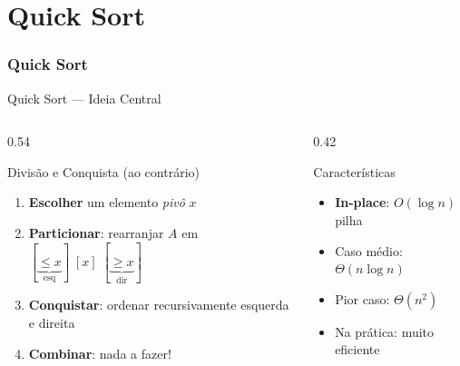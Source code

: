 \documentclass[aspectratio=169]{beamer}
\begin{document}
\part{Quick Sort}
\section{Quick Sort}

\begin{frame}{Quick Sort — Ideia Central}
  \begin{columns}[T]
    \begin{column}{0.54\textwidth}
      \begin{block}{Divisão e Conquista (ao contrário)}
        \begin{enumerate}
          \item \textbf{Escolher} um elemento \emph{pivô} $x$
          \item \textbf{Particionar}: rearranjar $A$ em\\
                $[\underbrace{\leq x}_{\text{esq}}]\;[x]\;[\underbrace{\geq x}_{\text{dir}}]$
          \item \textbf{Conquistar}: ordenar recursivamente esquerda e direita
          \item \textbf{Combinar}: nada a fazer!
        \end{enumerate}
      \end{block}
    \end{column}
    \begin{column}{0.42\textwidth}
      \begin{exampleblock}{Características}
        \begin{itemize}
          \item \textbf{In-place}: $O(\log n)$ pilha
          \item Caso médio: $\Theta(n \log n)$
          \item Pior caso: $\Theta(n^2)$
          \item Na prática: muito eficiente
        \end{itemize}
      \end{exampleblock}
    \end{column}
  \end{columns}
\end{frame}
\end{document}
